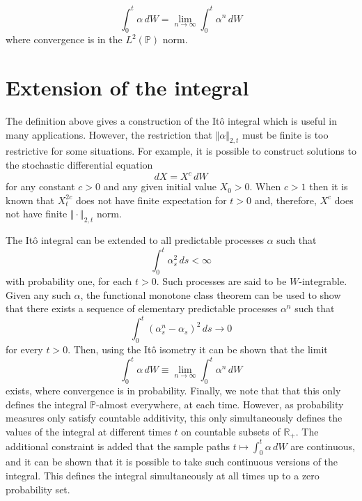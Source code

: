 \documentclass[12pt]{article}
\begin{document}
\begin{equation*}
\int_0^t\alpha\,dW=\lim_{n\rightarrow\infty}\int_0^t\alpha^n\,dW
\end{equation*}
where convergence is in the $L^2(\mathbb{P})$ norm.

\section{Extension of the integral}

The definition above gives a construction of the It\^o integral which is useful in many applications.
However, the restriction that $\Vert\alpha\Vert_{2,t}$ must be finite is too restrictive for some situations.
For example, it is possible to construct solutions to the stochastic differential equation
\begin{equation*}
dX = X^c\,dW
\end{equation*}
for any constant $c>0$ and any given initial value $X_0>0$. When $c>1$ then it is known that $X^{2c}_t$ does not have finite expectation for $t>0$ and, therefore, $X^c$ does not have finite $\Vert\cdot\Vert_{2,t}$ norm.

The It\^o integral can be extended to all predictable processes $\alpha$ such that
\begin{equation*}
\int_0^t\alpha^2_s\,ds<\infty
\end{equation*}
with probability one, for each $t>0$. Such processes are said to be $W$-integrable.
Given any such $\alpha$, the functional monotone class theorem can be used to show that there exists a sequence of elementary predictable processes $\alpha^n$ such that
\begin{equation*}
\int_0^t(\alpha^n_s-\alpha_s)^2\,ds\rightarrow 0
\end{equation*}
 for every $t>0$. Then, using the It\^o isometry it can be shown that the limit
\begin{equation*}
\int_0^t\alpha\,dW\equiv \lim_{n\rightarrow\infty}\int_0^t\alpha^n\,dW
\end{equation*}
exists, where convergence is in probability.
Finally, we note that that this only defines the integral $\mathbb{P}$-almost everywhere, at each time. However, as probability measures only satisfy countable additivity, this only simultaneously defines the values of the integral at different times $t$ on countable subsets of $\mathbb{R}_+$. The additional constraint is added that the sample paths $t\mapsto\int_0^t\alpha\,dW$ are continuous, and it can be shown that it is possible to take such continuous versions of the integral. This defines the integral simultaneously at all times up to a zero probability set.
\end{document}
